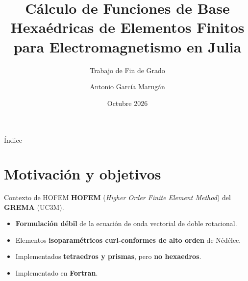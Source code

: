 \documentclass{beamer}
\title[]{Cálculo de Funciones de Base Hexaédricas de Elementos Finitos para Electromagnetismo en Julia}
\subtitle{Trabajo de Fin de Grado}
\author[Antonio García Marugán]{Antonio García Marugán}
\institute[UC3M]{Universidad Carlos III de Madrid}
\date{Octubre 2026}
\begin{document}
\begin{frame}
  \titlepage
\end{frame}

\begin{frame}{Índice}
  \tableofcontents
\end{frame}

\section{Motivación y objetivos}

\begin{frame}{Contexto de HOFEM}
  \textbf{HOFEM} (\textit{Higher Order Finite Element Method}) del
  \textbf{GREMA} (UC3M).
  \begin{itemize}\setlength\itemsep{2pt}
    \item \textbf{Formulación débil} de la ecuación de onda vectorial de doble
      rotacional.
    \item Elementos \textbf{isoparamétricos curl-conformes de alto orden} de
      Nédélec.
    \item Implementados \textbf{tetraedros y prismas}, pero \textbf{no hexaedros}.
    \item Implementado en \textbf{Fortran}.
  \end{itemize}
\end{frame}
\end{document}
